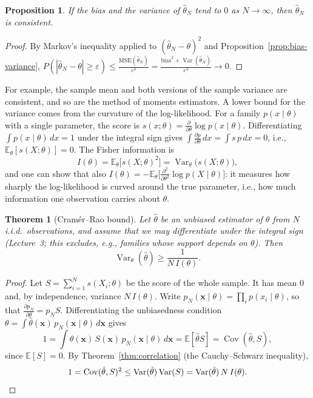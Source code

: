 \documentclass[11pt]{article}
\newcommand{\E}{\mathbb{E}}
\DeclareMathOperator{\Var}{Var}
\DeclareMathOperator{\Cov}{Cov}
\theoremstyle{definition}
\theoremstyle{plain}
\newtheorem{theorem}[definition]{Theorem}
\newtheorem{proposition}[definition]{Proposition}
\theoremstyle{remark}
\begin{document}
\begin{proposition}\label{prop:consistency}
    If the bias and the variance of $\hat\theta_N$ tend to $0$ as $N \to \infty$, then $\hat\theta_N$ is consistent.
\end{proposition}

\begin{proof}
    By Markov's inequality applied to $(\hat\theta_N - \theta)^2$ and Proposition~\ref{prop:bias-variance}, $P(|\hat\theta_N - \theta| \geq \varepsilon) \leq \frac{\mathrm{MSE}(\hat\theta_N)}{\varepsilon^2} = \frac{\text{bias}^2 + \Var(\hat\theta_N)}{\varepsilon^2} \to 0$.
\end{proof}

For example, the sample mean and both versions of the sample variance are consistent, and so are the method of moments estimators. A lower bound for the variance comes from the curvature of the log-likelihood. For a family $p(x \mid \theta)$ with a single parameter, the score is $s(x; \theta) = \frac{\partial}{\partial\theta}\log p(x \mid \theta)$. Differentiating $\int p(x \mid \theta)\, dx = 1$ under the integral sign gives $\int \frac{\partial p}{\partial\theta}\, dx = \int s\,p\, dx = 0$, i.e., $\E_\theta[s(X; \theta)] = 0$. The Fisher information is
\[I(\theta) = \E_\theta\big[s(X; \theta)^2\big] = \Var_\theta\big(s(X; \theta)\big),\]
and one can show that also $I(\theta) = -\E_\theta\big[\frac{\partial^2}{\partial\theta^2}\log p(X \mid \theta)\big]$: it measures how sharply the log-likelihood is curved around the true parameter, i.e., how much information one observation carries about $\theta$.

\begin{theorem}[Cram\'er--Rao bound]\label{thm:cramer-rao}
    Let $\hat\theta$ be an unbiased estimator of $\theta$ from $N$ i.i.d.\ observations, and assume that we may differentiate under the integral sign (Lecture~3; this excludes, e.g., families whose support depends on $\theta$). Then
    \[\Var_\theta(\hat\theta) \geq \frac{1}{N\,I(\theta)}.\]
\end{theorem}

\begin{proof}
    Let $S = \sum_{i=1}^N s(X_i; \theta)$ be the score of the whole sample. It has mean $0$ and, by independence, variance $N\,I(\theta)$. Write $p_N(\mathbf{x} \mid \theta) = \prod_i p(x_i \mid \theta)$, so that $\frac{\partial p_N}{\partial\theta} = p_N S$. Differentiating the unbiasedness condition $\theta = \int \hat\theta(\mathbf{x})\,p_N(\mathbf{x} \mid \theta)\, d\mathbf{x}$ gives
    \[1 = \int \hat\theta(\mathbf{x})\,S(\mathbf{x})\,p_N(\mathbf{x} \mid \theta)\, d\mathbf{x} = \E[\hat\theta S] = \Cov(\hat\theta, S),\]
    since $\E[S] = 0$. By Theorem~\ref{thm:correlation} (the Cauchy--Schwarz inequality),
    \[1 = \Cov(\hat\theta, S)^2 \leq \Var(\hat\theta)\Var(S) = \Var(\hat\theta)\,N\,I(\theta). \qedhere\]
\end{proof}
\end{document}
